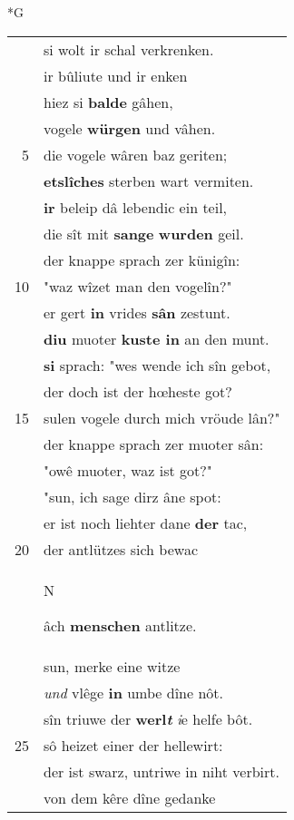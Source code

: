 \documentclass[8pt,a4paper,notitlepage]{article}
\begin{document}
\newpage
\begin{table}[ht]
\begin{minipage}[t]{0.5\linewidth}
\small
\begin{center}*G
\end{center}
\begin{tabular}{rl}
 & si wolt ir schal verkrenken.\\ 
 & ir bûliute und ir enken\\ 
 & hiez si \textbf{balde} gâhen,\\ 
 & vogele \textbf{würgen} und vâhen.\\ 
5 & die vogele wâren baz geriten;\\ 
 & \textbf{etslîches} sterben wart vermiten.\\ 
 & \textbf{ir} beleip dâ lebendic ein teil,\\ 
 & die sît mit \textbf{sange} \textbf{wurden} geil.\\ 
 & der knappe sprach zer künigîn:\\ 
10 & "waz wîzet man den vogelîn?"\\ 
 & er gert \textbf{in} vrides \textbf{sân} zestunt.\\ 
 & \textbf{diu} muoter \textbf{kuste in} an den munt.\\ 
 & \textbf{si} sprach: "wes wende ich sîn gebot,\\ 
 & der doch ist der hœheste got?\\ 
15 & sulen vogele durch mich vröude lân?"\\ 
 & der knappe sprach zer muoter sân:\\ 
 & "owê muoter, waz ist got?"\\ 
 & "sun, ich sage dirz âne spot:\\ 
 & er ist noch liehter dane \textbf{der} tac,\\ 
20 & der antlützes sich bewac\\ 
 & \begin{large}N\end{large}âch \textbf{menschen} antlitze.\\ 
 & sun, merke eine witze\\ 
 & \textit{und} vlêge \textbf{in} umbe dîne nôt.\\ 
 & sîn triuwe der \textbf{werl\textit{t}} \textit{i}e helfe bôt.\\ 
25 & sô heizet einer der hellewirt:\\ 
 & der ist swarz, untriwe in niht verbirt.\\ 
 & von dem kêre dîne gedanke\\ 

\end{tabular}
\end{minipage}
\end{table}
\end{document}

